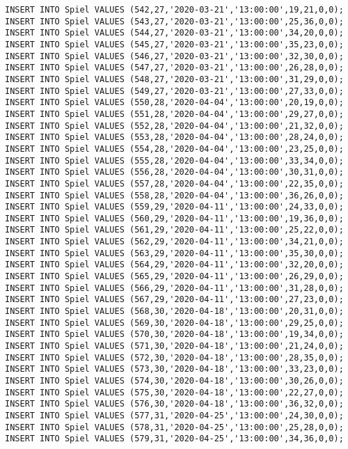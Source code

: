\documentclass{lehramt-informatik-aufgabe}
\begin{document}
\begin{verbatim}
INSERT INTO Spiel VALUES (542,27,'2020-03-21','13:00:00',19,21,0,0);
INSERT INTO Spiel VALUES (543,27,'2020-03-21','13:00:00',25,36,0,0);
INSERT INTO Spiel VALUES (544,27,'2020-03-21','13:00:00',34,20,0,0);
INSERT INTO Spiel VALUES (545,27,'2020-03-21','13:00:00',35,23,0,0);
INSERT INTO Spiel VALUES (546,27,'2020-03-21','13:00:00',32,30,0,0);
INSERT INTO Spiel VALUES (547,27,'2020-03-21','13:00:00',26,28,0,0);
INSERT INTO Spiel VALUES (548,27,'2020-03-21','13:00:00',31,29,0,0);
INSERT INTO Spiel VALUES (549,27,'2020-03-21','13:00:00',27,33,0,0);
INSERT INTO Spiel VALUES (550,28,'2020-04-04','13:00:00',20,19,0,0);
INSERT INTO Spiel VALUES (551,28,'2020-04-04','13:00:00',29,27,0,0);
INSERT INTO Spiel VALUES (552,28,'2020-04-04','13:00:00',21,32,0,0);
INSERT INTO Spiel VALUES (553,28,'2020-04-04','13:00:00',28,24,0,0);
INSERT INTO Spiel VALUES (554,28,'2020-04-04','13:00:00',23,25,0,0);
INSERT INTO Spiel VALUES (555,28,'2020-04-04','13:00:00',33,34,0,0);
INSERT INTO Spiel VALUES (556,28,'2020-04-04','13:00:00',30,31,0,0);
INSERT INTO Spiel VALUES (557,28,'2020-04-04','13:00:00',22,35,0,0);
INSERT INTO Spiel VALUES (558,28,'2020-04-04','13:00:00',36,26,0,0);
INSERT INTO Spiel VALUES (559,29,'2020-04-11','13:00:00',24,33,0,0);
INSERT INTO Spiel VALUES (560,29,'2020-04-11','13:00:00',19,36,0,0);
INSERT INTO Spiel VALUES (561,29,'2020-04-11','13:00:00',25,22,0,0);
INSERT INTO Spiel VALUES (562,29,'2020-04-11','13:00:00',34,21,0,0);
INSERT INTO Spiel VALUES (563,29,'2020-04-11','13:00:00',35,30,0,0);
INSERT INTO Spiel VALUES (564,29,'2020-04-11','13:00:00',32,20,0,0);
INSERT INTO Spiel VALUES (565,29,'2020-04-11','13:00:00',26,29,0,0);
INSERT INTO Spiel VALUES (566,29,'2020-04-11','13:00:00',31,28,0,0);
INSERT INTO Spiel VALUES (567,29,'2020-04-11','13:00:00',27,23,0,0);
INSERT INTO Spiel VALUES (568,30,'2020-04-18','13:00:00',20,31,0,0);
INSERT INTO Spiel VALUES (569,30,'2020-04-18','13:00:00',29,25,0,0);
INSERT INTO Spiel VALUES (570,30,'2020-04-18','13:00:00',19,34,0,0);
INSERT INTO Spiel VALUES (571,30,'2020-04-18','13:00:00',21,24,0,0);
INSERT INTO Spiel VALUES (572,30,'2020-04-18','13:00:00',28,35,0,0);
INSERT INTO Spiel VALUES (573,30,'2020-04-18','13:00:00',33,23,0,0);
INSERT INTO Spiel VALUES (574,30,'2020-04-18','13:00:00',30,26,0,0);
INSERT INTO Spiel VALUES (575,30,'2020-04-18','13:00:00',22,27,0,0);
INSERT INTO Spiel VALUES (576,30,'2020-04-18','13:00:00',36,32,0,0);
INSERT INTO Spiel VALUES (577,31,'2020-04-25','13:00:00',24,30,0,0);
INSERT INTO Spiel VALUES (578,31,'2020-04-25','13:00:00',25,28,0,0);
INSERT INTO Spiel VALUES (579,31,'2020-04-25','13:00:00',34,36,0,0);

\end{verbatim}
\end{document}
